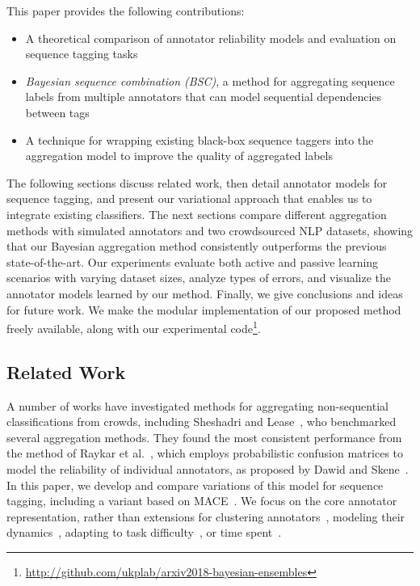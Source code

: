 This paper provides the following contributions:
\begin{itemize}
 \item A theoretical comparison of annotator reliability models 
 and evaluation on sequence tagging tasks
 \item \emph{Bayesian sequence combination (BSC)}, 
 a method for aggregating sequence labels from multiple annotators 
 that can model sequential dependencies between tags 
 \item A technique for wrapping existing black-box sequence taggers into the aggregation model to improve 
 the quality of aggregated labels
\end{itemize}
The following sections discuss related work, 
then detail annotator models for sequence tagging,
and present our variational approach that enables us to integrate existing classifiers. 
The next sections compare different aggregation methods
with simulated annotators and two crowdsourced NLP datasets,
showing that our Bayesian aggregation method consistently outperforms the previous state-of-the-art.
Our experiments evaluate both active and passive learning scenarios with varying dataset sizes, 
analyze types of errors, and visualize the annotator models learned by our method.
Finally, we give conclusions and ideas for future work.
We make the modular implementation of our proposed method freely available, along with our experimental code\footnote{\url{http://github.com/ukplab/arxiv2018-bayesian-ensembles}}.

\subsection{Related Work}

A number of works have investigated methods for aggregating non-sequential
classifications from crowds, including 
Sheshadri and Lease~, who benchmarked several 
aggregation methods. 
They found the most consistent performance from the method of
Raykar et al.~, which employs probabilistic confusion matrices 
to model the reliability of individual annotators,
as proposed by Dawid and Skene~\cite{dawid_maximum_1979}.
In this paper, we develop and compare variations of this model for sequence tagging,
including a variant based on MACE~\cite{hovy2013learning}.
We focus on the core annotator representation, rather than extensions 
for clustering annotators~\cite{venanzi2014community,moreno_bayesian_2015},
modeling their dynamics~\cite{simpsonlong},
adapting to task difficulty~\cite{whitehill2009whose,bachrach2012grade},
or time spent~\cite{venanzi2016time}.

